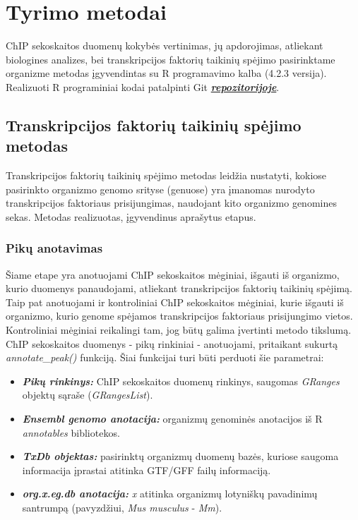 \documentclass[12pt]{article}
\begin{document}
\newpage


\section{Tyrimo metodai}
ChIP sekoskaitos duomenų kokybės vertinimas, jų apdorojimas, atliekant
biologines analizes, bei transkripcijos faktorių taikinių spėjimo pasirinktame
organizme metodas įgyvendintas su R programavimo kalba \cite{R} (4.2.3 versija).
Realizuoti R programiniai kodai patalpinti Git
\href{https://github.com/dansta0804/TF\_analysis}
{\textbf{\emph{repozitorijoje}}}.

\subsection{Transkripcijos faktorių taikinių spėjimo metodas}
Transkripcijos faktorių taikinių spėjimo metodas leidžia nustatyti, kokiose
pasirinkto organizmo genomo srityse (genuose) yra įmanomas nurodyto
transkripcijos faktoriaus prisijungimas, naudojant kito organizmo genomines
sekas. Metodas realizuotas, įgyvendinus aprašytus etapus.

\subsubsection*{Pikų anotavimas}
Šiame etape yra anotuojami ChIP sekoskaitos mėginiai, išgauti iš organizmo,
kurio duomenys panaudojami, atliekant transkripcijos faktorių taikinių spėjimą.
Taip pat anotuojami ir kontroliniai ChIP sekoskaitos mėginiai, kurie išgauti iš
organizmo, kurio genome spėjamos transkripcijos faktoriaus prisijungimo vietos.
Kontroliniai mėginiai reikalingi tam, jog būtų galima įvertinti metodo tikslumą.
ChIP sekoskaitos duomenys - pikų rinkiniai - anotuojami, pritaikant sukurtą
\emph{annotate\_peak()} funkciją. Šiai funkcijai turi būti perduoti šie
parametrai:

\begin{itemize}
    \item \textbf{\emph{Pikų rinkinys:}} ChIP sekoskaitos duomenų rinkinys,
        saugomas \emph{GRanges} objektų sąraše (\emph{GRangesList}).
    \item \textbf{\emph{Ensembl genomo anotacija:}} organizmų genominės
        anotacijos iš R \emph{annotables} bibliotekos.
    \item \textbf{\emph{TxDb objektas:}} pasirinktų organizmų duomenų bazės,
        kuriose saugoma informacija įprastai atitinka GTF/GFF failų informaciją.
    \item \textbf{\emph{org.x.eg.db anotacija:}} \emph{x} atitinka organizmų
        lotyniškų pavadinimų santrumpą (pavyzdžiui, \emph{Mus musculus} -
        \emph{Mm}).
\end{itemize}
\end{document}
